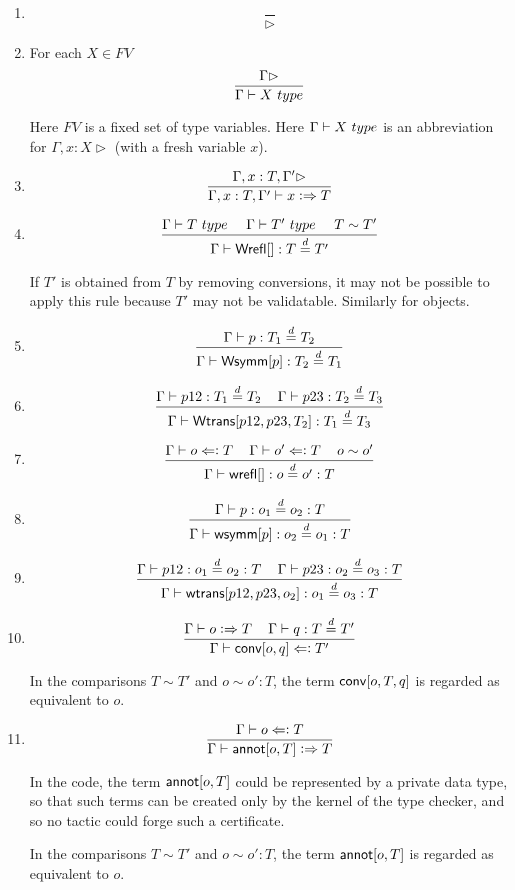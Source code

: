 \documentclass[11pt]{article}
\newcommand{\eqd}{\stackrel{d}{=}}
\newcommand{\spc}{{\,\,\,\,\,\,\,}}
\newcommand{\synth}{\vcentcolon\Rightarrow}
\newcommand{\force}{\Leftarrow\vcentcolon}
\newcommand{\Type}{\mathop{{\, \sc type}}}
\newcommand{\ha}[2]{#1[#2]}
\newcommand{\Wrefl}{{\sf Wrefl}}
\newcommand{\Wtrans}{{\sf Wtrans}}
\newcommand{\Wsymm}{{\sf Wsymm}}
\newcommand{\wrefl}{{\sf wrefl}}
\newcommand{\annot}{{\sf annot}}
\newcommand{\conv}{{\sf conv}}
\newcommand{\wsymm}{{\sf wsymm}}
\newcommand{\wtrans}{{\sf wtrans}}
\begin{document}
\begin{enumerate}

\item 
$$\frac{}{\rhd}$$

\item For each $X\in FV$
$$\frac{\Gamma\rhd}{\Gamma\vdash X \Type}$$

Here $FV$ is a fixed set of type variables.  Here $\Gamma\vdash X \Type$
is an abbreviation for $\Gamma, x:X\rhd$ (with a fresh variable $x$).

\item 
$$\frac{\Gamma, x:T, \Gamma'\rhd}{\Gamma, x:T, \Gamma'\vdash x \synth T}$$

\item 
$$\frac{\Gamma \vdash T \Type\spc \Gamma \vdash T'\Type \spc T\sim T'}{\Gamma\vdash \ha\Wrefl{}: T\eqd T'}$$

If $T'$ is obtained from $T$ by removing conversions, it may not be possible to apply
this rule because $T'$ may not be validatable.  Similarly for objects.

\item 
$$\frac{\Gamma\vdash p:T_1\eqd T_2}{\Gamma\vdash \ha\Wsymm{p}:T_2\eqd T_1}$$

\item 
$$\frac{\Gamma\vdash p12:T_1\eqd T_2\spc\Gamma\vdash p23:T_2\eqd T_3}{\Gamma\vdash \ha\Wtrans{p12,p23,T_2}: T_1\eqd T_3}$$

\item 
$$\frac{\Gamma\vdash o \force T\spc\Gamma\vdash o' \force T \spc o \sim o'}{\Gamma\vdash \ha\wrefl{}:o\eqd o':T}$$

\item 
$$\frac{\Gamma\vdash p:o_1\eqd o_2:T}{\Gamma\vdash \ha\wsymm{p}:o_2\eqd o_1:T}$$

\item 
$$\frac{\Gamma\vdash p12:o_1\eqd o_2:T\spc\Gamma\vdash p23:o_2\eqd o_3:T}{\Gamma\vdash \ha\wtrans{p12,p23,o_2}:o_1\eqd o_3:T}$$

\item 
$$\frac{\Gamma\vdash o \synth T\spc \Gamma\vdash q : T\eqd T'}{\Gamma\vdash \ha\conv{o,q} \force T'}$$

In the comparisons $T\sim T'$ and $o\sim o':T$, the term $\ha\conv{o,T,q}$ is regarded as equivalent to $o$.

\item 
$$\frac{\Gamma\vdash o \force T}{\Gamma\vdash \ha\annot{o,T} \synth T}$$

In the code, the term $\ha\annot{o,T}$ could be represented by a private data
type, so that such terms can be created only by the kernel of the type checker,
and so no tactic could forge such a certificate.

In the comparisons $T\sim T'$ and $o\sim o':T$, the term $\ha\annot{o,T}$ is regarded as equivalent to $o$.

\end{enumerate}
\end{document}
